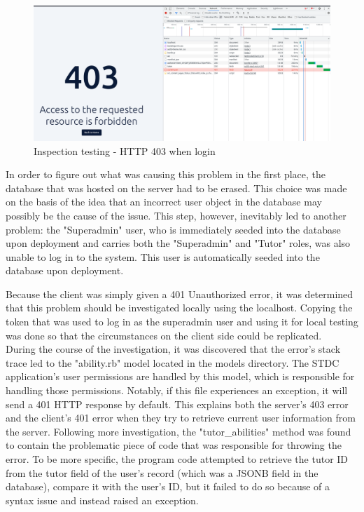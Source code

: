 \begin{justify}
    \begin{figure}[H]
        \centerline{\includegraphics[width=150mm,scale=1]{figures/implementation_and_testing/testing/MIS/403.png}}
        \caption{Inspection testing - HTTP 403 when login}
        \label{Inspection_403}
    \end{figure}

    \vspace{0.25cm}
    \newendline In order to figure out what was causing this problem in the first place, the database that was hosted on the server had to be erased. This choice was made on the basis of the idea that an incorrect user object in the database may possibly be the cause of the issue. This step, however, inevitably led to another problem: the "Superadmin" user, who is immediately seeded into the database upon deployment and carries both the "Superadmin" and "Tutor" roles, was also unable to log in to the system. This user is automatically seeded into the database upon deployment.

    \vspace{0.25cm}
    \newendline Because the client was simply given a 401 Unauthorized error, it was determined that this problem should be investigated locally using the localhost. Copying the token that was used to log in as the superadmin user and using it for local testing was done so that the circumstances on the client side could be replicated.\\

    \vspace{0.25cm}
    \newendline During the course of the investigation, it was discovered that the error's stack trace led to the "ability.rb" model located in the models directory. The STDC application's user permissions are handled by this model, which is responsible for handling those permissions. Notably, if this file experiences an exception, it will send a 401 HTTP response by default. This explains both the server's 403 error and the client's 401 error when they try to retrieve current user information from the server.
    \vspace{0.25cm}
    \newendline Following more investigation, the "tutor\_abilities" method was found to contain the problematic piece of code that was responsible for throwing the error. To be more specific, the program code attempted to retrieve the tutor ID from the tutor field of the user's record (which was a JSONB field in the database), compare it with the user's ID, but it failed to do so because of a syntax issue and instead raised an exception.


\end{justify}
